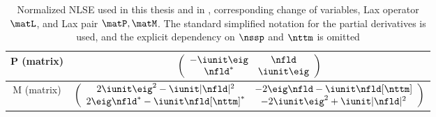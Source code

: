 \begin{table*}[p]
\begin{tabu}{|c|c|}
        P (matrix) &
        $\left( \begin{array}{cc} -\iunit\eig &
           \nfld  \\
          \nfld^* &
          \iunit\eig \end{array}\right)$
        \\ \hline

        M (matrix) &
        $\left( \begin{array}{cc} 2\iunit\eig^2 - \iunit|\nfld|^2 &
          - 2\eig\nfld - \iunit\nfld[\nttm] \\
          2\eig\nfld^* - \iunit\nfld[\nttm]^* &
          - 2\iunit\eig^2 + \iunit|\nfld|^2 \end{array}\right)$
        \\ \hline



        \end{tabu}
  \caption{Normalized \ac{NLSE} used in this thesis and in \cite{Yousefi2014,Ablowitz2004a,Docksey2000a,hari2016multieigenvalue,
tavakkolnia2015signalling}, corresponding change of variables, Lax operator $\matL$, and Lax pair $\matP, \matM$. The standard simplified notation for the partial derivatives is used, and the explicit dependency on $\nssp$ and $\nttm$ is omitted}
  \label{tab:normalizations_comparison_mansoor}
\end{table*}



